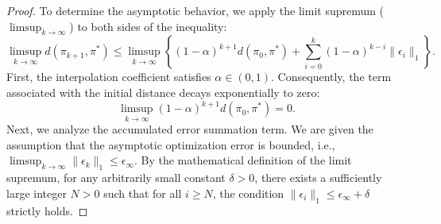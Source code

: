\documentclass{article}
\theoremstyle{plain}
\theoremstyle{definition}
\theoremstyle{remark}
\begin{document}
\begin{proof}
	To determine the asymptotic behavior, we apply the limit supremum ($\limsup_{k \rightarrow \infty}$) to both sides of the inequality:
	\begin{equation}
		\limsup_{k \rightarrow \infty}d(\pi_{k+1}, \pi^*)\leq\limsup_{k \rightarrow \infty}\left\{(1-\alpha)^{k+1}d(\pi_0,\pi^*)+\sum_{i=0}^{k}(1-\alpha)^{k-i}\lVert\epsilon_i\rVert_1\right\}.
	\end{equation}
	First, the interpolation coefficient satisfies $\alpha \in (0, 1)$. Consequently, the term associated with the initial distance decays exponentially to zero:
	\begin{equation}
		\limsup_{k \rightarrow \infty}(1-\alpha)^{k+1}d(\pi_0,\pi^*)=0.
	\end{equation}
	Next, we analyze the accumulated error summation term. We are given the assumption that the asymptotic optimization error is bounded, i.e., $\limsup_{k\rightarrow \infty}\lVert\epsilon_{k}\rVert_1\leq \epsilon_{\infty}$. By the mathematical definition of the limit supremum, for any arbitrarily small constant $\delta > 0$, there exists a sufficiently large integer $N > 0$ such that for all $i \geq N$, the condition $\lVert\epsilon_i\rVert_1 \leq \epsilon_{\infty} + \delta$ strictly holds.
	

\end{proof}
\end{document}
